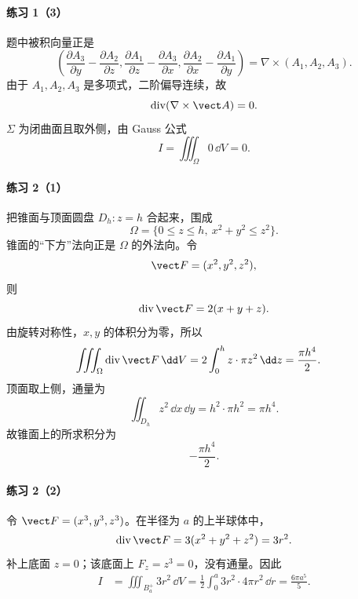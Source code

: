 \paragraph{练习 1（3）}
\begin{xsolution}
题中被积向量正是
\[
  \left(
  \frac{\partial A_3}{\partial y}-\frac{\partial A_2}{\partial z},
  \frac{\partial A_1}{\partial z}-\frac{\partial A_3}{\partial x},
  \frac{\partial A_2}{\partial x}-\frac{\partial A_1}{\partial y}
  \right)=\nabla\times(A_1,A_2,A_3).
\]
由于 $A_1,A_2,A_3$ 是多项式，二阶偏导连续，故
\[
  \operatorname{div}(\nabla\times\vect A)=0.
\]
$\Sigma$ 为闭曲面且取外侧，由 Gauss 公式
\[
  \boxed{I=\iiint_\Omega0\,\dd V=0}.
\]
\end{xsolution}

\paragraph{练习 2（1）}
\begin{xsolution}
把锥面与顶面圆盘 $D_h:z=h$ 合起来，围成
\[
  \Omega=\{0\le z\le h,\ x^2+y^2\le z^2\}.
\]
锥面的“下方”法向正是 $\Omega$ 的外法向。令
\[
  \vect F=(x^2,y^2,z^2),
\]
则
\[
  \operatorname{div}\vect F=2(x+y+z).
\]
由旋转对称性，$x,y$ 的体积分为零，所以
\begin{align*}
\iiint_\Omega\operatorname{div}\vect F\,\dd V
&=2\int_0^h z\cdot\pi z^2\,\dd z
=\frac{\pi h^4}{2}.
\end{align*}
顶面取上侧，通量为
\[
  \iint_{D_h}z^2\,\dd x\,\dd y=h^2\cdot\pi h^2=\pi h^4.
\]
故锥面上的所求积分为
\[
  \boxed{-\frac{\pi h^4}{2}}.
\]
\end{xsolution}

\paragraph{练习 2（2）}
\begin{xsolution}
令 $\vect F=(x^3,y^3,z^3)$。在半径为 $a$ 的上半球体中，
\[
  \operatorname{div}\vect F=3(x^2+y^2+z^2)=3r^2.
\]
补上底面 $z=0$；该底面上 $F_z=z^3=0$，没有通量。因此
\begin{align*}
I
&=\iiint_{B_a^+}3r^2\,\dd V
=\frac12\int_0^a3r^2\cdot4\pi r^2\,\dd r
=\frac{6\pi a^5}{5}.
\end{align*}
\end{xsolution}

